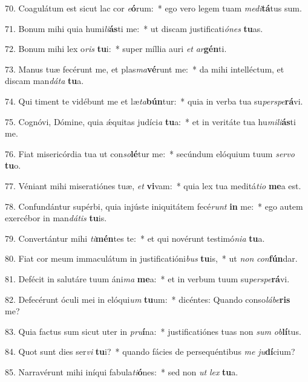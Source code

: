70. Coagulátum est sicut lac cor \textit{e}\textbf{ó}rum:~*  ego vero legem tuam \textit{me}\textit{di}\textbf{tá}tus sum.\

71. Bonum mihi quia humi\textit{li}\textbf{ás}ti me:~*  ut discam justificati\textit{ó}\textit{nes} \textbf{tu}as.\

72. Bonum mihi lex o\textit{ris} \textbf{tu}i:~*  super míllia auri \textit{et} \textit{ar}\textbf{gén}ti.\

73. Manus tuæ fecérunt me, et plas\textit{ma}\textbf{vé}runt me:~*  da mihi intelléctum, et discam man\textit{dá}\textit{ta} \textbf{tu}a.\

74. Qui timent te vidébunt me et læ\textit{ta}\textbf{bún}tur:~*  quia in verba tua su\textit{per}\textit{spe}\textbf{rá}vi.\

75. Cognóvi, Dómine, quia ǽquitas judíci\textit{a} \textbf{tu}a:~*  et in veritáte tua hu\textit{mi}\textit{li}\textbf{ás}ti me.\

76. Fiat misericórdia tua ut con\textit{so}\textbf{lé}tur me:~*  secúndum elóquium tuum \textit{ser}\textit{vo} \textbf{tu}o.\

77. Véniant mihi miseratiónes tuæ, \textit{et} \textbf{vi}vam:~*  quia lex tua meditá\textit{ti}\textit{o} \textbf{me}a est.\

78. Confundántur supérbi, quia injúste iniquitátem fecé\textit{runt} \textbf{in} me:~*  ego autem exercébor in man\textit{dá}\textit{tis} \textbf{tu}is.\

79. Convertántur mihi \textit{ti}\textbf{mén}tes te:~*  et qui novérunt testimó\textit{ni}\textit{a} \textbf{tu}a.\

80. Fiat cor meum immaculátum in justificatióni\textit{bus} \textbf{tu}is,~*  ut \textit{non} \textit{con}\textbf{fún}dar.\

81. Defécit in salutáre tuum áni\textit{ma} \textbf{me}a:~*  et in verbum tuum su\textit{per}\textit{spe}\textbf{rá}vi.\

82. Defecérunt óculi mei in elóqui\textit{um} \textbf{tu}um:~*  dicéntes: Quando conso\textit{lá}\textit{be}\textbf{ris} me?\

83. Quia factus sum sicut uter in \textit{pru}\textbf{í}na:~*  justificatiónes tuas non \textit{sum} \textit{ob}\textbf{lí}tus.\

84. Quot sunt dies ser\textit{vi} \textbf{tu}i?~*  quando fácies de persequéntibus \textit{me} \textit{ju}\textbf{dí}cium?\

85. Narravérunt mihi iníqui fabula\textit{ti}\textbf{ó}nes:~*  sed non \textit{ut} \textit{lex} \textbf{tu}a.\

